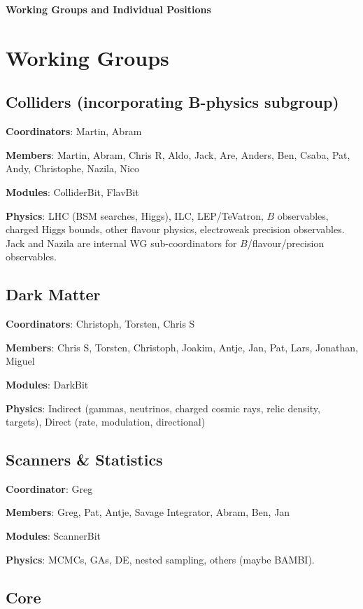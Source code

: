 

\centerline{\textbf{Working Groups and Individual Positions}}\bigskip 


\section{Working Groups}

\subsection{Colliders (incorporating B-physics subgroup)}

\textbf{Coordinators}: Martin, Abram

\textbf{Members}: Martin, Abram, Chris R, Aldo, Jack, Are, Anders, Ben, Csaba, Pat, Andy, Christophe, Nazila, Nico 

\textbf{Modules}: ColliderBit, FlavBit

\textbf{Physics}: LHC (BSM searches, Higgs), ILC, LEP/TeVatron, $B$ observables, charged Higgs bounds, other flavour physics, electroweak precision observables.  Jack and Nazila are internal WG sub-coordinators for $B$/flavour/precision observables.


\subsection{Dark Matter}

\textbf{Coordinators}: Christoph, Torsten, Chris S

\textbf{Members}: Chris S, Torsten, Christoph, Joakim, Antje, Jan, Pat, Lars, Jonathan, Miguel

\textbf{Modules}: DarkBit

\textbf{Physics}: Indirect (gammas, neutrinos, charged cosmic rays, relic density, targets), Direct (rate, modulation, directional)


\subsection{Scanners \& Statistics}

\textbf{Coordinator}: Greg

\textbf{Members}: Greg, Pat, Antje, Savage Integrator, Abram, Ben, Jan

\textbf{Modules}: ScannerBit

\textbf{Physics}: MCMCs, GAs, DE, nested sampling, others (maybe BAMBI).


\subsection{Core}

